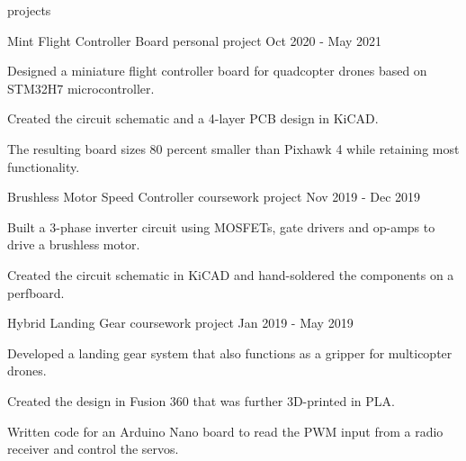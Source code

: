 \begin{section}{projects}

  \begin{project}
    {Mint Flight Controller Board}
    {personal project}
    {Oct 2020 - May 2021}

    \item Designed a miniature flight controller board for quadcopter drones based on STM32H7 microcontroller.
    \item Created the circuit schematic and a 4-layer PCB design in KiCAD.
    \item The resulting board sizes 80 percent smaller than Pixhawk 4 while retaining most functionality.
  
  \end{project}

  \begin{project}
    {Brushless Motor Speed Controller}
    {coursework project}
    {Nov 2019 - Dec 2019}

    \item Built a 3-phase inverter circuit using MOSFETs, gate drivers and op-amps to drive a brushless motor.
    \item Created the circuit schematic in KiCAD and hand-soldered the components on a perfboard.
  
  \end{project}

  \begin{project}
    {Hybrid Landing Gear}
    {coursework project}
    {Jan 2019 - May 2019}

    \item Developed a landing gear system that also functions as a gripper for multicopter drones.
    \item Created the design in Fusion 360 that was further 3D-printed in PLA.
    \item Written code for an Arduino Nano board to read the PWM input from a radio receiver and control the servos.
  
  \end{project}

\end{section}
